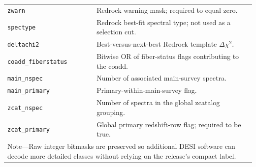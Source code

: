\documentclass[twocolumn,linenumbers]{aastex702}
\begin{document}
\begin{center}
\begin{tabular}{p{}p{}}
\texttt{zwarn} & Redrock warning mask; required to equal zero. \\
\texttt{spectype} & Redrock best-fit spectral type; not used as a selection cut. \\
\texttt{deltachi2} & Best-versus-next-best Redrock template $\Delta\chi^2$. \\
\texttt{coadd\_fiberstatus} & Bitwise OR of fiber-status flags contributing to the coadd. \\
\texttt{main\_nspec} & Number of associated main-survey spectra. \\
\texttt{main\_primary} & Primary-within-main-survey flag. \\
\texttt{zcat\_nspec} & Number of spectra in the global zcatalog grouping. \\
\texttt{zcat\_primary} & Global primary redshift-row flag; required to be true. \\
\bottomrule
\multicolumn{2}{p{0.93\textwidth}}{\footnotesize Note---Raw integer bitmasks are preserved so
additional DESI software can decode more detailed classes without relying on the release's compact
label.}\\
\end{tabular}
\end{center}
\end{document}

